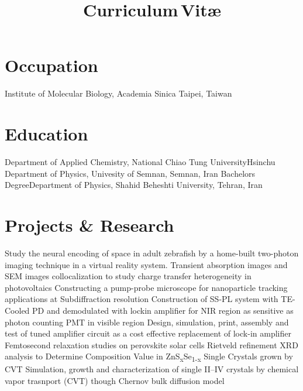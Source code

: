 \documentclass[11pt,a4paper, nolmodern]{moderncv}
\title{Curriculum\,Vit\ae}
\begin{document}
\makecvtitle
\vspace{-1.5cm}
\section{Occupation}
		{Institute of Molecular Biology, Academia Sinica}
		{Taipei, Taiwan}{}{}
\section{Education}
		{Department of Applied Chemistry, National Chiao
		Tung University}{Hsinchu}{}{}
		{Department of Physics, Univesity of Semnan, Semnan, Iran}{}{}{}
		{Bachelors Degree}{Department of Physics, Shahid 
		Beheshti University, Tehran, Iran}{}{}{}
\section{Projects \& Research}
		{Study the neural encoding of space in adult zebrafish by a home-built two-photon 
		imaging technique in a virtual reality system.}
		{Transient absorption images and SEM images collocalization to study charge transfer heterogeneity in photovoltaics}
		{Constructing a pump-probe microscope for nanoparticle tracking applications at Subdiffraction resolution}
		{Construction of SS-PL system with TE-Cooled PD 
		and demodulated with lockin amplifier for NIR region as 
		sensitive as photon counting PMT in visible region}
		{Design, simulation, print, assembly and test 
		of tuned amplifier circuit as a cost effective replacement 
		of lock-in amplifier}
		{Femtosecond relaxation studies on perovskite solar cells}
		{Rietveld refinement XRD analysis to 
		Determine Composition Value in ZnS\textsubscript{x}Se\textsubscript{1-x} 
		Single Crystals grown by CVT}
		{Simulation, growth and characterization 
		of single II--IV crystals 
		by chemical vapor trasnport (CVT) though Chernov bulk diffusion model}
\end{document}

